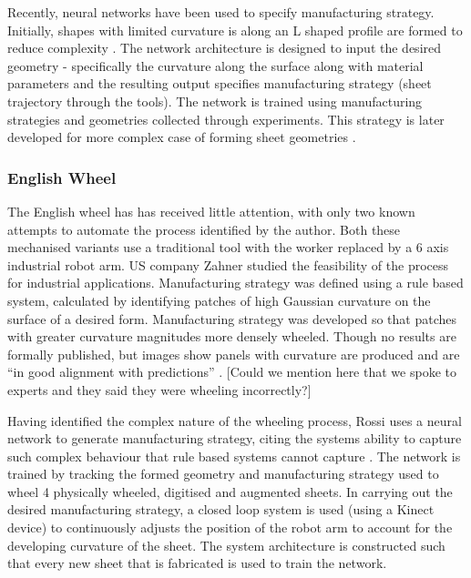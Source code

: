 Recently, neural networks have been used to specify manufacturing strategy. Initially, shapes with limited curvature is along an L shaped profile are formed to reduce complexity \citep{Opritescu2015AutomatedApproach}. The network architecture is designed to input the desired geometry - specifically the curvature along the surface along with material parameters and the resulting output specifies manufacturing strategy (sheet trajectory through the tools). The network is trained using manufacturing strategies and geometries collected through experiments. This strategy is later developed for more complex case of forming sheet geometries \citep{Hartmann2019AnFree-forming}.

\subsubsection*{English Wheel}
The English wheel has has received little attention, with only two known attempts to automate the process identified by the author. Both these mechanised variants use a traditional tool with the worker replaced by a 6 axis industrial robot arm. US company Zahner studied the feasibility of the process for industrial applications. Manufacturing strategy was defined using a rule based system, calculated by identifying patches of high Gaussian curvature on the surface of a desired form. Manufacturing strategy was developed so that patches with greater curvature magnitudes more densely wheeled. Though no results are formally published, but images show panels with curvature are produced and are ``in good alignment with predictions'' \citep{Vazquez2017RoboticWheeling,Vazquez2017EfficientSurfaces}. [Could we mention here that we spoke to experts and they said they were wheeling incorrectly?]

Having identified the complex nature of the wheeling process, Rossi uses a neural network to generate manufacturing strategy, citing the systems ability to capture such complex behaviour that rule based systems cannot capture \citep{Rossi2018ModellingWheel, Rossi2018Re/LearningSurfaces}. The network is trained by tracking the formed geometry and manufacturing strategy used to wheel 4 physically wheeled, digitised and augmented sheets. In carrying out the desired manufacturing strategy, a closed loop system is used (using a Kinect device) to continuously adjusts the position of the robot arm to account for the developing curvature of the sheet. The system architecture is constructed such that every new sheet that is fabricated is used to train the network.

